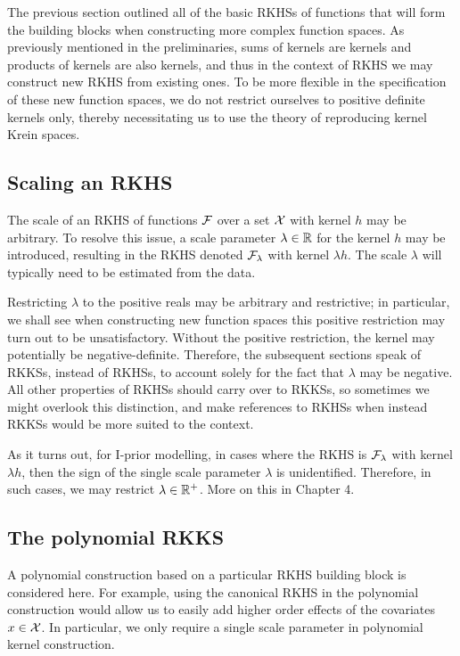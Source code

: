 
The previous section outlined all of the basic RKHSs of functions that will form the building blocks when constructing more complex function spaces.
As previously mentioned in the preliminaries, sums of kernels are kernels and products of kernels are also kernels, and thus in the context of RKHS we may construct new RKHS from existing ones.
To be more flexible in the specification of these new function spaces, we do not restrict ourselves to positive definite kernels only, thereby necessitating us to use the theory of reproducing kernel Krein spaces.

\subsection{Scaling an RKHS}

The scale of an RKHS of functions ${\mathcal F}$ over a set ${\mathcal X}$ with kernel $h$ may be arbitrary.
To resolve this issue, a scale parameter $\lambda\in\mathbb{R}$ for the kernel $h$ may be introduced, resulting in the RKHS denoted ${\mathcal F}_\lambda$ with kernel $\lambda h$.
The scale $\lambda$ will typically need to be estimated from the data.

Restricting $\lambda$ to the positive reals may be arbitrary and restrictive; in particular, we shall see when constructing new function spaces this positive restriction may turn out to be unsatisfactory.
Without the positive restriction, the kernel may potentially be negative-definite.
Therefore, the subsequent sections speak of RKKSs, instead of RKHSs, to account solely for the fact that $\lambda$ may be negative.
All other properties of RKHSs should carry over to RKKSs, so sometimes we might overlook this distinction, and make references to RKHSs when instead RKKSs would be more suited to the context.
$\phantom{1}$
\begin{remark}
  As it turns out, for I-prior modelling, in cases where the RKHS is ${\mathcal F}_\lambda$ with kernel $\lambda h$, then the sign of the single scale parameter $\lambda$ is unidentified.
  Therefore, in such cases, we may restrict $\lambda\in\mathbb{R}^+$.
  More on this in Chapter 4.
\end{remark}

\subsection{The polynomial RKKS}

A polynomial construction based on a particular RKHS building block is considered here.
For example, using the canonical RKHS in the polynomial construction would allow us to easily add higher order effects of the covariates $x \in {\mathcal X}$.
In particular, we only require a single scale parameter in polynomial kernel construction.

